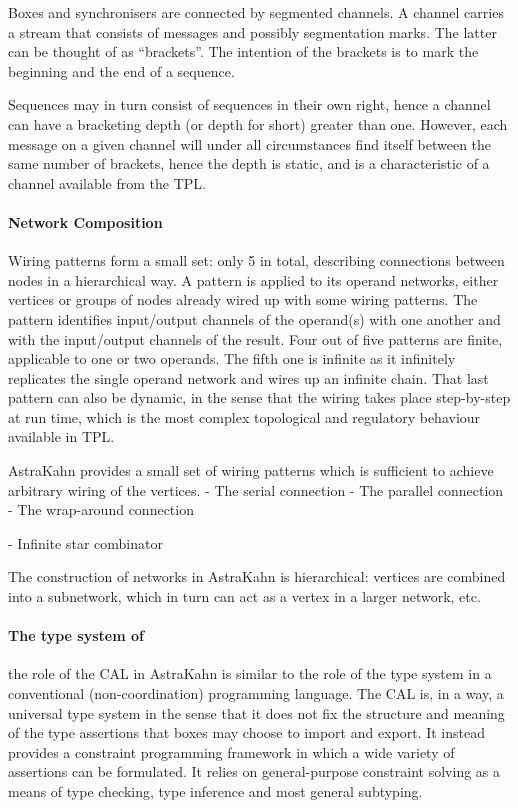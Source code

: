 Boxes and synchronisers are connected by segmented channels. A channel carries a stream that
consists of messages and possibly segmentation marks. The latter can be thought of as “brackets”. The intention of the brackets is to mark the beginning and the end of a sequence.

Sequences may in turn consist of sequences in their own right, hence a channel can have a bracketing depth (or depth for short) greater than one. However, each message on a given channel will under all circumstances find itself between the same number of brackets, hence the depth is static, and is a characteristic of a channel available from the TPL.


\paragraph{Network Composition}

Wiring patterns form a small set: only 5 in total, describing connections between
nodes in a hierarchical way. A pattern is applied to its operand networks, either vertices or groups of nodes already wired up with some wiring patterns. The pattern identifies input/output channels of the operand(s) with one another and with the input/output channels of the result. Four out of five patterns are finite, applicable to one or two operands. The fifth one is infinite as it infinitely replicates the single operand network and wires up an infinite chain. That last pattern can also be dynamic, in the sense that the wiring takes place step-by-step at run time, which is the most complex topological and regulatory behaviour available in TPL.

AstraKahn provides a small set of wiring patterns which is sufficient to achieve arbitrary wiring of the vertices.
- The serial connection
- The parallel connection
- The wrap-around connection

- Infinite star combinator


The construction of networks in AstraKahn is hierarchical: vertices are combined into a subnetwork, which in turn can act as a vertex in a larger network, etc.


\paragraph{The type system of \ak\ }

the role of the CAL in AstraKahn is similar to the role
of the type system in a conventional (non-coordination) programming language. The CAL is, in a way, a universal type system in the sense that it does not fix the structure and meaning of the type assertions that boxes may choose to import and export. It instead provides a constraint programming framework in which a wide variety of assertions can be formulated. It relies on general-purpose constraint solving as a means of type checking, type inference and most general subtyping.

